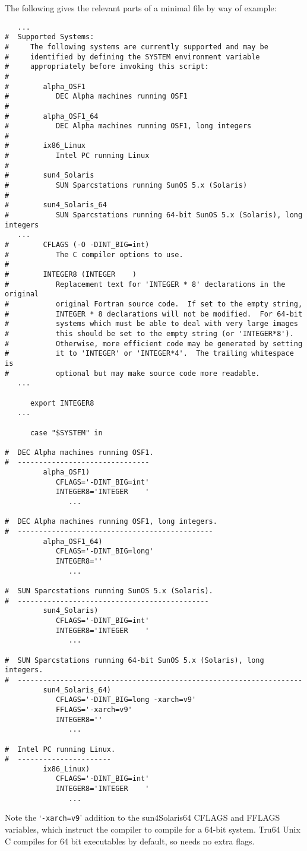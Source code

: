 \documentclass[twoside,11pt]{article}
\renewcommand{\_}{\texttt{\symbol{95}}}
\begin{document}
The following gives the relevant parts of a minimal 
file by way of example:
\begin{squote}
\begin{verbatim}
   ...
#  Supported Systems:
#     The following systems are currently supported and may be
#     identified by defining the SYSTEM environment variable
#     appropriately before invoking this script:
#
#        alpha_OSF1
#           DEC Alpha machines running OSF1
#
#        alpha_OSF1_64
#           DEC Alpha machines running OSF1, long integers
#
#        ix86_Linux
#           Intel PC running Linux
#
#        sun4_Solaris
#           SUN Sparcstations running SunOS 5.x (Solaris)
#
#        sun4_Solaris_64
#           SUN Sparcstations running 64-bit SunOS 5.x (Solaris), long integers
   ...
#        CFLAGS (-O -DINT_BIG=int)
#           The C compiler options to use.
#
#        INTEGER8 (INTEGER    )
#           Replacement text for 'INTEGER * 8' declarations in the original
#           original Fortran source code.  If set to the empty string,
#           INTEGER * 8 declarations will not be modified.  For 64-bit
#           systems which must be able to deal with very large images
#           this should be set to the empty string (or 'INTEGER*8').
#           Otherwise, more efficient code may be generated by setting
#           it to 'INTEGER' or 'INTEGER*4'.  The trailing whitespace is
#           optional but may make source code more readable.
   ...

      export INTEGER8
   ...

      case "$SYSTEM" in

#  DEC Alpha machines running OSF1.
#  -------------------------------
         alpha_OSF1)
            CFLAGS='-DINT_BIG=int'
            INTEGER8='INTEGER    '
               ...

#  DEC Alpha machines running OSF1, long integers.
#  ----------------------------------------------
         alpha_OSF1_64)
            CFLAGS='-DINT_BIG=long'
            INTEGER8=''
               ...

#  SUN Sparcstations running SunOS 5.x (Solaris).
#  ---------------------------------------------
         sun4_Solaris)
            CFLAGS='-DINT_BIG=int'
            INTEGER8='INTEGER    '
               ...

#  SUN Sparcstations running 64-bit SunOS 5.x (Solaris), long integers.
#  -------------------------------------------------------------------
         sun4_Solaris_64)
            CFLAGS='-DINT_BIG=long -xarch=v9'
            FFLAGS='-xarch=v9'
            INTEGER8=''
               ...

#  Intel PC running Linux.
#  ----------------------
         ix86_Linux)
            CFLAGS='-DINT_BIG=int'
            INTEGER8='INTEGER    '
               ...
\end{verbatim}
\end{squote}
Note the `{\tt -xarch=v9}' addition to the sun4\_Solaris\_64 CFLAGS
and FFLAGS variables,
which instruct the compiler to compile for a 64-bit system.
Tru64 Unix C compiles for 64 bit executables by default, so needs no
extra flags.
\end{document}
